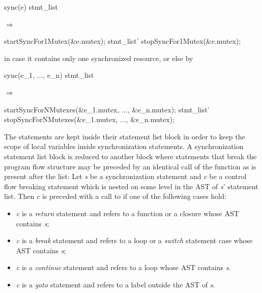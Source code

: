 \begin{center}
\begin{minipage}{0.3\textwidth}
\begin{ccode}
sync(e) stmt_list
\end{ccode}
\end{minipage}
\qquad$\Longrightarrow$\qquad\qquad\qquad
\begin{minipage}{0.4\textwidth}
\begin{ccode}
startSyncFor1Mutex(&e.mutex);
stmt_list'
stopSyncFor1Mutex(&e.mutex);
\end{ccode}
\end{minipage}
\end{center}

in case it contains only one synchronized resource, or else by

\begin{center}
\begin{minipage}{0.3\textwidth}
\begin{ccode}
sync(e_1, ..., e_n) stmt_list
\end{ccode}
\end{minipage}
\qquad$\Longrightarrow$\qquad\qquad\qquad
\begin{minipage}{0.4\textwidth}
\begin{ccode}
startSyncForNMutexes(&e_1.mutex, ..., &e_n.mutex);
stmt_list'
stopSyncForNMutexes(&e_1.mutex, ..., &e_n.mutex);
\end{ccode}
\end{minipage}
\end{center}

The statements are kept inside their statement list block in order to keep the scope of local variables inside synchronization statements. A synchronization statement list block is reduced to another block where statements that break the program flow structure may be preceded by an identical call of the  function as is present after the list: Let \textit{s} be a synchronization statement and \textit{c} be a control flow breaking statement which is nested on some level in the AST of \textit{s}' statement list. Then \textit{c} is preceded with a call to  if one of the following cases hold:
\begin{itemize}[label=]
\item \textit{c} is a \textit{return} statement and refers to a function or a closure whose AST contains \textit{s};
\item \textit{c} is a \textit{break} statement and refers to a loop or a \textit{switch} statement case whose AST contains \textit{s};
\item \textit{c} is a \textit{continue} statement and refers to a loop whose AST contains \textit{s}.
\item \textit{c} is a \textit{goto} statement and refers to a label outside the AST of \textit{s}.
\end{itemize}

